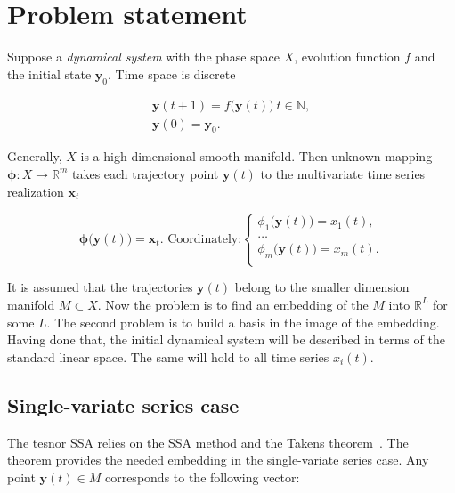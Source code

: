\documentclass[referee, pdflatex, sn-mathphys-num]{sn-jnl}
\theoremstyle{definition}
\theoremstyle{plain}
\begin{document}
	\section{Problem statement}\label{sec:problem_statement}
	
	Suppose a \emph{dynamical system} with the phase space $ X $, evolution function $ f $ and the initial state $ \mathbf{y}_0 $. Time space is discrete
	
	\begin{gather*}
		\mathbf{y}(t + 1) = f \bigl( \mathbf{y}(t) \bigr) \ t \in \mathbb{N}, \\
		\mathbf{y}(0) = \mathbf{y}_0 .
	\end{gather*}
	
	Generally, $ X $ is a high-dimensional smooth manifold. Then unknown mapping $ \boldsymbol{\phi}: X \to \mathbb{R}^m $ takes each trajectory point $ \mathbf{y}(t) $ to the multivariate time series realization $ \mathbf{x}_t $
	
	\begin{equation*}
		\boldsymbol{\phi} \bigl( \mathbf{y}(t) \bigr) = \mathbf{x}_t. \text{ Coordinately:} \begin{cases}
			\phi_1 \bigl( \mathbf{y}(t) \bigr) = x_1(t), \\
			\ldots \\
			\phi_m \bigl( \mathbf{y}(t) \bigr) = x_m(t). \\
		\end{cases}
	\end{equation*}
	
	It is assumed that the trajectories $ \mathbf{y}(t) $ belong to the smaller dimension manifold $ M \subset X $. Now the problem is to find an embedding of the $ M $ into $ \mathbb{R}^{L} $ for some $ L $. The second problem is to build a basis in the image of the embedding. Having done that, the initial dynamical system will be described in terms of the standard linear space. The same will hold to all time series $ x_i(t) $.

	\subsection{Single-variate series case}\label{sec:one_series}
	
	The tesnor SSA relies on the SSA method and the Takens theorem~\cite{citeulike:2735031}. The theorem provides the needed embedding in the single-variate series case. Any point $ \mathbf{y}(t) \in M $ corresponds to the following vector:
	
\end{document}
